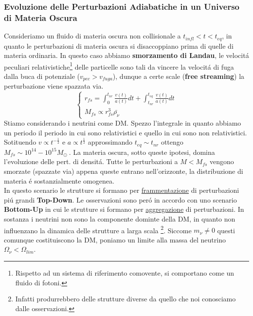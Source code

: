 \documentclass[12pt, a4paper]{article}
\begin{document}
\subsubsection{Evoluzione delle Perturbazioni Adiabatiche in un Universo di Materia Oscura}
Consideriamo un fluido di materia oscura non collisionale a $t_{infl}<t<t_{eq}$, in quanto le perturbazioni di materia oscura si disaccoppiano prima di quelle di materia ordinaria. In questo caso abbiamo \textbf{smorzamento di Landau}, le velocit\'{a} peculiari relativistiche\footnote{Rispetto ad un sistema di riferimento comovente, si comportano come un fluido di fotoni.} delle particelle sono tali da vincere la velocit\'{a} di fuga dalla buca di potenziale ($v_{pec}>v_{fuga}$), dunque a certe scale (\textbf{free streaming}) la perturbazione viene spazzata via.\\
\begin{equation}
\begin{cases}
r_{fs}= \int_0^{t_{nr}}\frac{v(t)}{a(t)} dt+\int_{t_{nr}}^{t_{eq}}\frac{v(t)}{a(t)} dt
\\
M_{fs}\propto r_{fs}^3 \bar{\rho_{\nu}}
\end{cases}
\end{equation}
Stiamo considerando i neutrini come DM. Spezzo l'integrale in quanto abbiamo un periodo il periodo in cui sono relativistici e quello in cui sono non relativistici. Sotituendo $v\propto t^{-\frac{1}{2}}$ e $a\propto t^{\frac{1}{2}} $ approssimando $t_{eq}\sim t_{nr}$ ottengo $M_{fs}\sim 10^{14} - 10^{15} M_\odot\ $. La materia oscura, sotto queste ipotesi, domina l'evoluzione delle pert. di densit\'{a}. Tutte le perturbazioni a $M<M_{fs}$ vengono smorzate (spazzate via) appena queste entrano nell'orizzonte, la distribuzione di materia \'{e} sostanzialmente omogenea.\\
In questo scenario le strutture si formano per \underline{frammentazione} di perturbazioni pi\'{u} grandi \textbf{Top-Down}. Le osservazioni sono per\'{o} in accordo con uno scenario \textbf{Bottom-Up} in cui le strutture si formano per \underline{aggregazione} di perturbazioni. In sostanza i neutrini non sono la componente dominte della DM, in quanto non influenzano la dinamica delle strutture a larga scala \footnote{Infatti produrrebbero delle strutture diverse da quello che noi conosciamo dalle osservazioni.}. Siccome $m_{\nu}\neq 0 $ questi comunque costituiscono la DM, poniamo un limite alla massa del neutrino $\Omega_{\nu}<\Omega_{lim}$.
\end{document}
